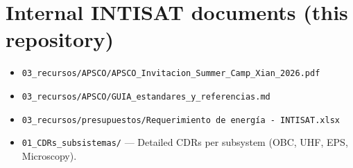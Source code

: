\section*{Internal INTISAT documents (this repository)}
\begin{itemize}
    \item \texttt{03\_recursos/APSCO/APSCO\_Invitacion\_Summer\_Camp\_Xian\_2026.pdf}
    \item \texttt{03\_recursos/APSCO/GUIA\_estandares\_y\_referencias.md}
    \item \texttt{03\_recursos/presupuestos/Requerimiento de energía - INTISAT.xlsx}
    \item \texttt{01\_CDRs\_subsistemas/} — Detailed CDRs per subsystem (OBC, UHF, EPS, Microscopy).
\end{itemize}
